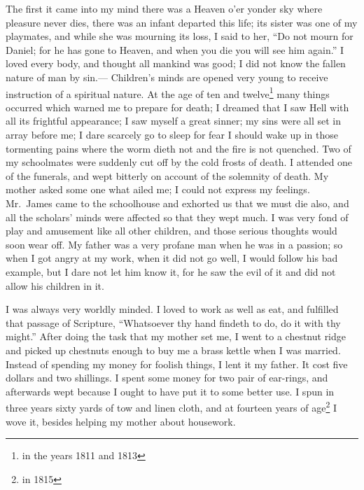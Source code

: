 The first it came into my mind there was a Heaven o'er yonder sky where pleasure never dies, there was an infant departed this life; its sister was one of my playmates, and while she was mourning its loss, I said to her, ``Do not mourn for Daniel; for he has gone to Heaven, and when you die you will see him again.''
I loved every body, and thought all mankind was good; I did not know the fallen nature of man by sin.---%
Children's minds are opened very young to receive instruction of a spiritual nature.
At the age of ten and twelve\footnote{in the years 1811 and 1813} many things occurred which warned me to prepare for death; I dreamed that I saw Hell with all its frightful appearance; I saw myself a great sinner; my sins were all set in array before me; I dare scarcely go to sleep for fear I should wake up in those tormenting pains where the worm dieth not and the fire is not quenched.
Two of my schoolmates were suddenly cut off by the cold frosts of death.
I attended one of the funerals, and wept bitterly on account of the solemnity of death.
My mother asked some one what ailed me; I could not express my feelings.
Mr.\ James came to the schoolhouse and exhorted us that we must die also, and all the scholars' minds were affected so that they wept much.
I was very fond of play and amusement like all other children, and those serious thoughts would soon wear off.
My father was a very profane man when he was in a passion; so when I got angry at my work, when it did not go well, I would follow his bad example, but I dare not let him know it, for he saw the evil of it and did not allow his children in it.

I was always very worldly minded.
I loved to work as well as eat, and fulfilled that passage of Scripture, ``Whatsoever thy hand findeth to do, do it with thy might.''
After doing the task that my mother set me, I went to a chestnut ridge and picked up chestnuts enough to buy me a brass kettle when I was married.
Instead of spending my money for foolish things, I lent it my father.
It cost five dollars and two shillings.
I spent some money for two pair of ear-rings, and afterwards wept because I ought to have put it to some better use.
I spun in three years sixty yards of tow and linen cloth, and at fourteen years of age\footnote{in 1815} I wove it, besides helping my mother about housework.

